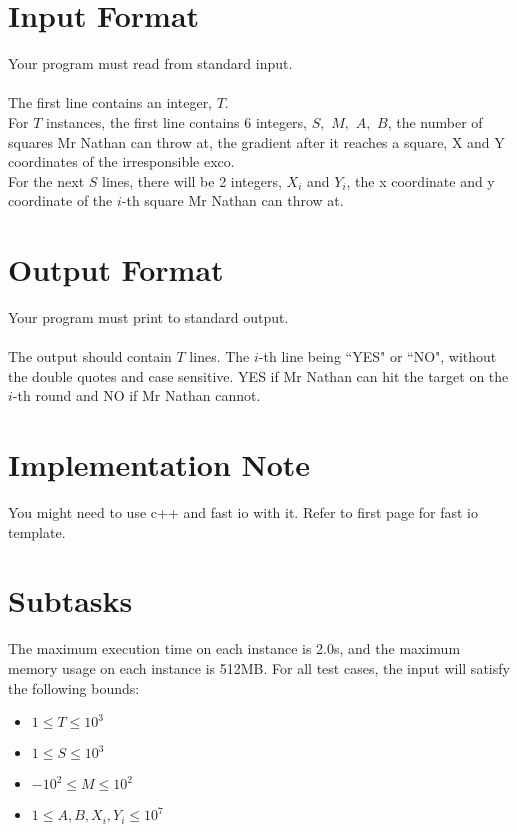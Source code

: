 \documentclass{report}
\begin{document}
\pagebreak
\hfill \break \hfill \break

\section*{Input Format}
Your program must read from standard input.
\\\\
The first line contains an integer, $T$. 
\\
For $T$ instances, the first line contains 6 integers, $S,$ $M,$ $A,$ $B$, the number of squares Mr Nathan can throw at, the gradient after it reaches a square, X and Y coordinates of the irresponsible exco.
\\ 
For the next $S$ lines, there will be 2 integers, $X_i$ and $Y_i$, the x coordinate and y coordinate of the $i$-th square Mr Nathan can throw at.

\section*{Output Format}
Your program must print to standard output.
\\\\
The output should contain $T$ lines. The $i$-th line being ``YES" or ``NO", without the double quotes and case sensitive. YES if Mr Nathan can hit the target on the $i$-th round and NO if Mr Nathan cannot.

\section*{Implementation Note}
You might need to use c++ and fast io with it. Refer to first page for fast io template. 

\section*{Subtasks}
The maximum execution time on each instance is 2.0s, and the maximum memory usage on each instance is 512MB. For all test cases, the input will satisfy the following bounds:

\begin{itemize}
    \item $1 \leq T \leq 10^3$
    \item $1 \leq S \leq 10^3$
    \item $-10^2 \leq M \leq 10^2$
    \item $1 \leq A, B, X_i, Y_i \leq 10^{7}$
\end{itemize}
\end{document}
